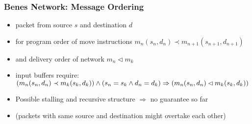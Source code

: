 \begin{frame}
	\frametitle{Benes Network: Message Ordering}
	\begin{itemize}
		\item packet from source $s$ and destination $d$
		\item for program order of move instructions $m_n(s_n, d_n) \prec m_{n+1}(s_{n+1}, d_{n+1})$
		\item and delivery order of network $m_n \lhd m_k$
		\item input buffers require:\\
		      $(m_n(s_n, d_n) \prec m_k(s_k, d_k)) \wedge (s_n = s_k \wedge d_n = d_k) \\
		      \Rightarrow (m_n(s_n, d_n) \lhd m_k(s_k, d_k))$
		
		\item Possible stalling and recursive structure $\Rightarrow$ no guarantee so far
		\item (packets with same source and destination might overtake each other)
	\end{itemize}
\end{frame}
	
